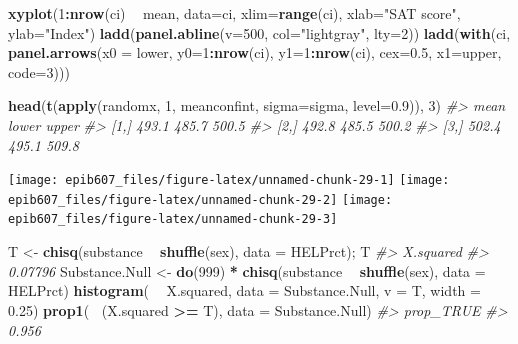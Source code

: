 \documentclass[]{book}
\makeatletter
\newenvironment{Shaded}{\begin{snugshade}}{\end{snugshade}}
\newcommand{\KeywordTok}[1]{\textcolor[rgb]{0.13,0.29,0.53}{\textbf{#1}}}
\newcommand{\DataTypeTok}[1]{\textcolor[rgb]{0.13,0.29,0.53}{#1}}
\newcommand{\DecValTok}[1]{\textcolor[rgb]{0.00,0.00,0.81}{#1}}
\newcommand{\FloatTok}[1]{\textcolor[rgb]{0.00,0.00,0.81}{#1}}
\newcommand{\StringTok}[1]{\textcolor[rgb]{0.31,0.60,0.02}{#1}}
\newcommand{\CommentTok}[1]{\textcolor[rgb]{0.56,0.35,0.01}{\textit{#1}}}
\newcommand{\OperatorTok}[1]{\textcolor[rgb]{0.81,0.36,0.00}{\textbf{#1}}}
\newcommand{\NormalTok}[1]{#1}
\newenvironment{kframe}{%
\medskip{}
\setlength{\fboxsep}{.8em}
 \def\at@end@of@kframe{}%
 \ifinner\ifhmode%
  \def\at@end@of@kframe{\end{minipage}}%
  \begin{minipage}{\columnwidth}%
 \fi\fi%
 \def\FrameCommand##1{\hskip\@totalleftmargin \hskip-\fboxsep
 \colorbox{shadecolor}{##1}\hskip-\fboxsep
     \hskip-\linewidth \hskip-\@totalleftmargin \hskip\columnwidth}%
 \MakeFramed {\advance\hsize-\width
   \@totalleftmargin\z@ \linewidth\hsize
   \@setminipage}}%
 {\par\unskip\endMakeFramed%
 \at@end@of@kframe}
\renewenvironment{Shaded}{\begin{kframe}}{\end{kframe}}
\theoremstyle{definition}
\theoremstyle{definition}
\theoremstyle{definition}
\theoremstyle{remark}
\makeatother
\begin{document}
\begin{Shaded}
\begin{Highlighting}[]
\KeywordTok{xyplot}\NormalTok{(}\DecValTok{1}\OperatorTok{:}\KeywordTok{nrow}\NormalTok{(ci) }\OperatorTok{~}\StringTok{ }\NormalTok{mean, }\DataTypeTok{data=}\NormalTok{ci, }\DataTypeTok{xlim=}\KeywordTok{range}\NormalTok{(ci), }\DataTypeTok{xlab=}\StringTok{"SAT score"}\NormalTok{, }\DataTypeTok{ylab=}\StringTok{"Index"}\NormalTok{)}
\KeywordTok{ladd}\NormalTok{(}\KeywordTok{panel.abline}\NormalTok{(}\DataTypeTok{v=}\DecValTok{500}\NormalTok{, }\DataTypeTok{col=}\StringTok{"lightgray"}\NormalTok{, }\DataTypeTok{lty=}\DecValTok{2}\NormalTok{))}
\KeywordTok{ladd}\NormalTok{(}\KeywordTok{with}\NormalTok{(ci, }\KeywordTok{panel.arrows}\NormalTok{(}\DataTypeTok{x0 =}\NormalTok{ lower, }\DataTypeTok{y0=}\DecValTok{1}\OperatorTok{:}\KeywordTok{nrow}\NormalTok{(ci), }\DataTypeTok{y1=}\DecValTok{1}\OperatorTok{:}\KeywordTok{nrow}\NormalTok{(ci), }\DataTypeTok{cex=}\FloatTok{0.5}\NormalTok{,}
                           \DataTypeTok{x1=}\NormalTok{upper, }\DataTypeTok{code=}\DecValTok{3}\NormalTok{)))}

\KeywordTok{head}\NormalTok{(}\KeywordTok{t}\NormalTok{(}\KeywordTok{apply}\NormalTok{(randomx, }\DecValTok{1}\NormalTok{, meanconfint, }\DataTypeTok{sigma=}\NormalTok{sigma, }\DataTypeTok{level=}\FloatTok{0.9}\NormalTok{)), }\DecValTok{3}\NormalTok{)}
\CommentTok{#>       mean lower upper}
\CommentTok{#> [1,] 493.1 485.7 500.5}
\CommentTok{#> [2,] 492.8 485.5 500.2}
\CommentTok{#> [3,] 502.4 495.1 509.8}
\end{Highlighting}
\end{Shaded}

\begin{center}\texttt{[image: epib607\_files/figure-latex/unnamed-chunk-29-1]} \texttt{[image: epib607\_files/figure-latex/unnamed-chunk-29-2]} \texttt{[image: epib607\_files/figure-latex/unnamed-chunk-29-3]} \end{center}

\begin{Shaded}
\begin{Highlighting}[]
\NormalTok{T <-}\StringTok{ }\KeywordTok{chisq}\NormalTok{(substance }\OperatorTok{~}\StringTok{ }\KeywordTok{shuffle}\NormalTok{(sex), }\DataTypeTok{data =}\NormalTok{ HELPrct); T}
\CommentTok{#> X.squared }
\CommentTok{#>   0.07796}
\NormalTok{Substance.Null <-}\StringTok{ }\KeywordTok{do}\NormalTok{(}\DecValTok{999}\NormalTok{) }\OperatorTok{*}\StringTok{ }\KeywordTok{chisq}\NormalTok{(substance }\OperatorTok{~}\StringTok{ }\KeywordTok{shuffle}\NormalTok{(sex), }\DataTypeTok{data =}\NormalTok{ HELPrct)}
\KeywordTok{histogram}\NormalTok{( }\OperatorTok{~}\StringTok{ }\NormalTok{X.squared, }\DataTypeTok{data =}\NormalTok{ Substance.Null, }\DataTypeTok{v =}\NormalTok{ T, }\DataTypeTok{width =} \FloatTok{0.25}\NormalTok{)}
\KeywordTok{prop1}\NormalTok{( }\OperatorTok{~}\NormalTok{(X.squared }\OperatorTok{>=}\StringTok{ }\NormalTok{T), }\DataTypeTok{data =}\NormalTok{ Substance.Null)}
\CommentTok{#> prop_TRUE }
\CommentTok{#>     0.956}
\end{Highlighting}
\end{Shaded}
\end{document}
